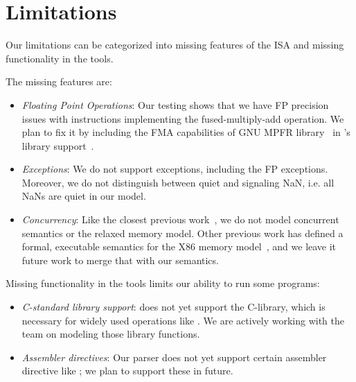 \section{Limitations}\label{sec:limit}
Our limitations can be categorized into missing features of the \ISA ISA and missing functionality in the \K tools.

The missing \ISA features are:
%
\begin{itemize}
 \item {\em Floating Point Operations\/}: Our testing shows that we have FP precision issues with instructions implementing the fused-multiply-add operation. We plan to fix it by including the FMA capabilities of GNU MPFR library~\cite{GNUMPFR} in \K's library support~\cite{MPFRJAVA}.
 \item {\em Exceptions\/}: We do not support exceptions, including the FP exceptions. Moreover, we do not distinguish between quiet and signaling NaN, i.e. all NaNs are quiet in our model.
 \item {\em Concurrency\/}: Like the closest previous work~\cite{Goel:FMCAD14,Heule2016a}, we do not model concurrent semantics or the relaxed memory model. Other previous work has defined a formal, executable semantics for the X86 memory model~\cite{Sarkar:POPL09,Owens:x86-TSO}, and we leave it future work to merge that with our semantics.
\end{itemize}

Missing functionality in the \K tools limits our ability to run some programs:
%
\begin{itemize}
 \item {\em C-standard library support\/}: \K does not yet support the C-library, which is necessary for widely used operations like . We are actively working with the \K team on modeling those library functions.
 \item {\em Assembler directives\/}: Our parser does not yet support certain assembler directive like ; we plan to support these in future.
\end{itemize}
